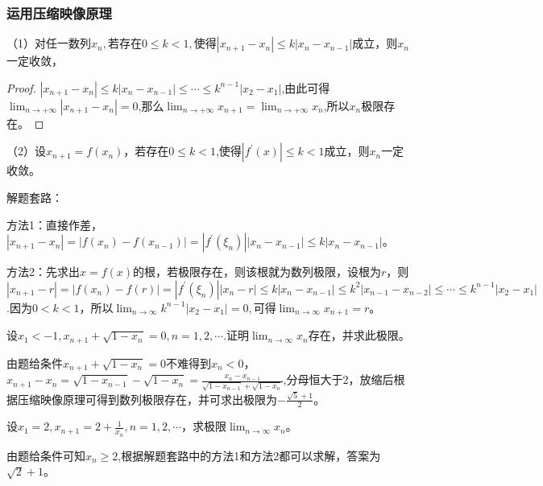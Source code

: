 \subsubsection{运用压缩映像原理}

（1）对任一数列${x_n},$若存在$0\leq k<1,$使得$|x_{n+1}-x_n|\leq k|x_n-x_{n-1}|$成立，则${x_n}$一定收敛，

\begin{proof}
	$|x_{n+1}-x_n|\leq k|x_n-x_{n-1}|\leq \cdots \leq k^{n-1}|x_2-x_1|$,由此可得$\lim_{n \to +\infty}|x_{n+1}-x_n|=0$,那么$\lim_{n \to +\infty}x_{n+1}=\lim_{n \to +\infty}x_n$,所以${x_n}$极限存在。
\end{proof}

（2）设$x_{n+1}=f(x_n)$，若存在$0\leq k<1$,使得$|f^{'}(x)|\leq k<1$成立，则${x_n}$一定收敛。

解题套路：

方法1：直接作差，$|x_{n+1}-x_n|=|f(x_n)-f(x_{n-1})|=|f^{'}(\xi _n)||x_n-x_{n-1}|\leq k|x_n-x_{n-1}|$。

方法2：先求出$x=f(x)$的根，若极限存在，则该根就为数列极限，设根为$r$，则$|x_{n+1}-r|=|f(x_n)-f(r)| =|f^{'}(\xi _n)||x_n-r|\leq k|x_n-x_{n-1}|\leq k^2|x_{n-1}-x_{n-2}|\leq \cdots \leq k^{n-1}|x_2-x_1|$.因为$0<k<1$，所以$\lim_{n \to \infty}k^{n-1}|x_2-x_1|=0,$可得$\lim_{n \to \infty}x_{n+1}=r$。

\begin{example}
	设$x_1<-1,x_{n+1}+\sqrt{1-x_n}=0,n=1,2,\cdots.$证明$\lim_{n \to \infty}x_n$存在，并求此极限。
	\begin{solution}
		由题给条件$x_{n+1}+\sqrt{1-x_n}=0$不难得到$x_n<0$，$x_{n+1}-x_n=\sqrt{1-x_{n-1}}-\sqrt{1-x_n}=\frac{x_n-x_{n-1}}{\sqrt{1-x_{n-1}}+\sqrt{1-x_n}}$,分母恒大于2，放缩后根据压缩映像原理可得到数列极限存在，并可求出极限为$-\frac{\sqrt{5}+1}{2}$。
	\end{solution}
\end{example}

\begin{example}
	设$x_1=2,x_{n+1}=2+\frac{1}{x_n},n=1,2,\cdots$，求极限$\lim_{n \to \infty}x_n$。
	\begin{solution}
		由题给条件可知$x_n\geq 2$,根据解题套路中的方法1和方法2都可以求解，答案为$\sqrt{2}+1$。
	\end{solution}
\end{example}
